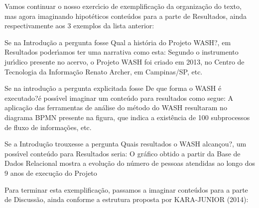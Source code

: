 \documentclass[
12pt,		%
openright,	%
twoside,  %
a4paper,			%
chapter=TITLE,		%
english,			%
french,				%
spanish,			%
brazil				%
]{USPSC-classe/USPSC}
\begin{document}
Vamos continuar o nosso exerc\'{\i}cio de exemplifica\c{c}\~ao da organiza\c{c}\~ao do texto, mas agora imaginando hipot\'eticos conte\'udos para a parte de Resultados, ainda respectivamente aos 3 exemplos da lista anterior:











\begin{alineas}
\item Se na Introdu\c{c}\~ao a pergunta fosse \textquotedbl Qual a hist\'oria do Projeto WASH?\textquotedbl , em Resultados poder\'{\i}amos ter uma narrativa como esta: \textquotedbl Segundo o instrumento jur\'{\i}dico presente no acervo, o Projeto WASH foi criado em 2013, no Centro de Tecnologia da Informa\c{c}\~ao Renato Archer, em Campinas/SP, etc.\textquotedbl 
\item Se na introdu\c{c}\~ao a pergunta explicitada fosse \textquotedbl De que forma o WASH \'e executado?\textquotedbl  \'e poss\'{\i}vel imaginar um conte\'udo para resultados como segue: \textquotedbl A aplica\c{c}\~ao das ferramentas de an\'alise do m\'etodo do WASH resultaram no diagrama BPMN presente na figura, que indica a exist\^encia de 100 subprocessos de fluxo de informa\c{c}\~oes, etc.\textquotedbl 
\item Se a Introdu\c{c}\~ao trouxesse a pergunta \textquotedbl Quais resultados o WASH alcan\c{c}ou?\textquotedbl , um poss\'{\i}vel conte\'udo para Resultados seria: \textquotedbl O gr\'afico obtido a partir da Base de Dados Relacional mostra a evolu\c{c}\~ao do n\'umero de pessoas atendidas ao longo dos 9 anos de execu\c{c}\~ao do Projeto\textquotedbl 
\end{alineas}

Para terminar esta exemplifica\c{c}\~ao, passamos a imaginar conte\'udos para a parte de Discuss\~ao, ainda conforme a estrutura proposta por  KARA-JUNIOR (2014):
\end{document}
